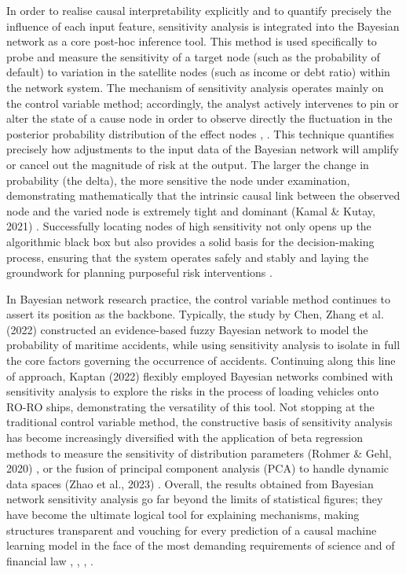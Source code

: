 In order to realise causal interpretability explicitly and to quantify precisely the influence of each input feature, sensitivity analysis is integrated into the Bayesian network as a core post-hoc inference tool. This method is used specifically to probe and measure the sensitivity of a target node (such as the probability of default) to variation in the satellite nodes (such as income or debt ratio) within the network system. The mechanism of sensitivity analysis operates mainly on the control variable method; accordingly, the analyst actively intervenes to pin or alter the state of a cause node in order to observe directly the fluctuation in the posterior probability distribution of the effect nodes \cite{liu2024credit}, \cite{kamal2021sensitivity}. This technique quantifies precisely how adjustments to the input data of the Bayesian network will amplify or cancel out the magnitude of risk at the output. The larger the change in probability (the delta), the more sensitive the node under examination, demonstrating mathematically that the intrinsic causal link between the observed node and the varied node is extremely tight and dominant (Kamal \& Kutay, 2021) \cite{kamal2021sensitivity}. Successfully locating nodes of high sensitivity not only opens up the algorithmic black box but also provides a solid basis for the decision-making process, ensuring that the system operates safely and stably and laying the groundwork for planning purposeful risk interventions \cite{bueff2022counterfactual}.

In Bayesian network research practice, the control variable method continues to assert its position as the backbone. Typically, the study by Chen, Zhang et al. (2022) \cite{chen2022marine} constructed an evidence-based fuzzy Bayesian network to model the probability of maritime accidents, while using sensitivity analysis to isolate in full the core factors governing the occurrence of accidents. Continuing along this line of approach, Kaptan (2022) \cite{kaptan2022analysis} flexibly employed Bayesian networks combined with sensitivity analysis to explore the risks in the process of loading vehicles onto RO-RO ships, demonstrating the versatility of this tool. Not stopping at the traditional control variable method, the constructive basis of sensitivity analysis has become increasingly diversified with the application of beta regression methods to measure the sensitivity of distribution parameters (Rohmer \& Gehl, 2020) \cite{rohmer2020sensitivity}, or the fusion of principal component analysis (PCA) to handle dynamic data spaces (Zhao et al., 2023) \cite{zhao2023mechanism}. Overall, the results obtained from Bayesian network sensitivity analysis go far beyond the limits of statistical figures; they have become the ultimate logical tool for explaining mechanisms, making structures transparent and vouching for every prediction of a causal machine learning model in the face of the most demanding requirements of science and of financial law \cite{european2016gdpr}, \cite{liu2024credit}, \cite{scholkopf2021causal}, \cite{peters2017elements}.



